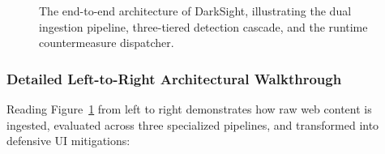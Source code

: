 \documentclass[11pt,a4paper]{article}
\begin{document}
\begin{figure}[htbp]
    \caption{The end-to-end architecture of DarkSight, illustrating the dual ingestion pipeline, three-tiered detection cascade, and the runtime countermeasure dispatcher.}
    \label{fig:full_arch}
\end{figure}

\subsubsection{Detailed Left-to-Right Architectural Walkthrough}
\label{subsubsec:arch_walkthrough}

Reading Figure~\ref{fig:full_arch} from left to right demonstrates how raw web content is ingested, evaluated across three specialized pipelines, and transformed into defensive UI mitigations:
\end{document}
